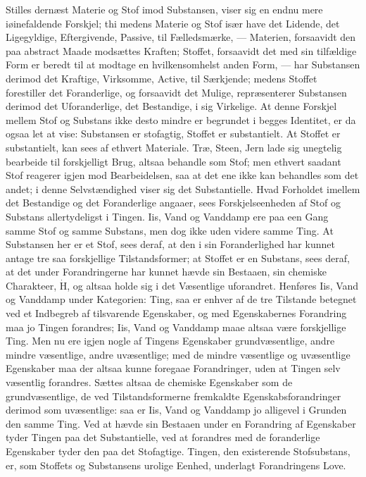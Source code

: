 \documentclass[12pt,a4paper]{book}
\begin{document}
Stilles dernæst Materie og Stof imod Substansen, viser
sig en endnu mere iøinefaldende Forskjel; thi medens Materie
og Stof især have det Lidende, det Ligegyldige, Eftergivende,
Passive, til Fælledsmærke, --- Materien, forsaavidt den paa
abstract Maade modsættes Kraften; Stoffet, forsaavidt det
med sin tilfældige Form er beredt til at modtage en
hvilkensomhelst anden Form, --- har Substansen derimod det
Kraftige, Virksomme, Active, til Særkjende; medens Stoffet
forestiller det Foranderlige, og forsaavidt det Mulige,
repræsenterer Substansen derimod det Uforanderlige, det Bestandige,
i sig Virkelige. At denne Forskjel mellem Stof og Substans
ikke desto mindre er begrundet i begges Identitet, er da ogsaa
let at vise: Substansen er stofagtig, Stoffet er substantielt.
At Stoffet er substantielt, kan sees af ethvert Materiale.
Træ, Steen, Jern lade sig unegtelig bearbeide til forskjelligt
Brug, altsaa behandle som Stof; men ethvert saadant Stof
reagerer igjen mod Bearbeidelsen, saa at det ene ikke kan
behandles som det andet; i denne Selvstændighed viser sig
det Substantielle. Hvad Forholdet imellem det Bestandige
og det Foranderlige angaaer, sees Forskjelseenheden af Stof
og Substans allertydeligst i Tingen. Iis, Vand og Vanddamp
ere paa een Gang samme Stof og samme Substans,
men dog ikke uden videre samme Ting. At Substansen her
er et Stof, sees deraf, at den i sin Foranderlighed har kunnet
antage tre saa forskjellige Tilstandsformer; at Stoffet er en
Substans, sees deraf, at det under Forandringerne har kunnet
hævde sin Bestaaen, sin chemiske Charakteer, $\dot{\mathrm{H}}$, og altsaa
holde sig i det Væsentlige uforandret. Henføres Iis, Vand
og Vanddamp under Kategorien: Ting, saa er enhver af de
tre Tilstande betegnet ved et Indbegreb af tilsvarende
Egenskaber, og med Egenskabernes Forandring maa jo Tingen
forandres; Iis, Vand og Vanddamp maae altsaa være
forskjellige Ting. Men nu ere igjen nogle af Tingens
Egenskaber grundvæsentlige, andre mindre væsentlige, andre
uvæsentlige; med de mindre væsentlige og uvæsentlige Egenskaber maa
der altsaa kunne foregaae Forandringer, uden at Tingen selv
væsentlig forandres. Sættes altsaa de chemiske Egenskaber
som de grundvæsentlige, de ved Tilstandsformerne fremkaldte
Egenskabsforandringer derimod som uvæsentlige: saa er Iis,
Vand og Vanddamp jo alligevel i Grunden den samme
Ting. Ved at hævde sin Bestaaen under en Forandring af
Egenskaber tyder Tingen paa det Substantielle, ved at
forandres med de foranderlige Egenskaber tyder den paa det
Stofagtige. Tingen, den existerende Stofsubstans, er, som
Stoffets og Substansens urolige Eenhed, underlagt
Forandringens Love.
\end{document}
